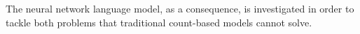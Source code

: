 The neural network language model, as a consequence, is investigated in order to tackle both problems that traditional count-based models cannot solve. 






%
%
